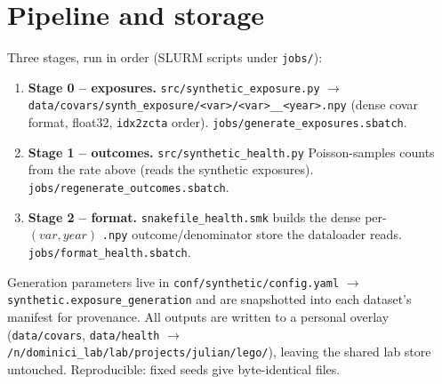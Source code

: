 \documentclass[11pt]{article}
\newcommand{\code}[1]{\texttt{\small #1}}
\begin{document}
\section{Pipeline and storage}
Three stages, run in order (SLURM scripts under \code{jobs/}):
\begin{enumerate}\itemsep1pt
  \item \textbf{Stage 0 -- exposures.} \code{src/synthetic\_exposure.py}
        $\to$ \code{data/covars/synth\_exposure/<var>/<var>\_\_<year>.npy}
        (dense covar format, float32, \code{idx2zcta} order). \code{jobs/generate\_exposures.sbatch}.
  \item \textbf{Stage 1 -- outcomes.} \code{src/synthetic\_health.py} Poisson-samples counts from the
        rate above (reads the synthetic exposures). \code{jobs/regenerate\_outcomes.sbatch}.
  \item \textbf{Stage 2 -- format.} \code{snakefile\_health.smk} builds the dense per-$(var,year)$
        \code{.npy} outcome/denominator store the dataloader reads. \code{jobs/format\_health.sbatch}.
\end{enumerate}
Generation parameters live in \code{conf/synthetic/config.yaml} $\to$
\code{synthetic.exposure\_generation} and are snapshotted into each dataset's manifest for provenance.
All outputs are written to a personal overlay
(\code{data/covars}, \code{data/health} $\to$ \code{/n/dominici\_lab/lab/projects/julian/lego/}),
leaving the shared lab store untouched. Reproducible: fixed seeds give byte-identical files.
\end{document}
